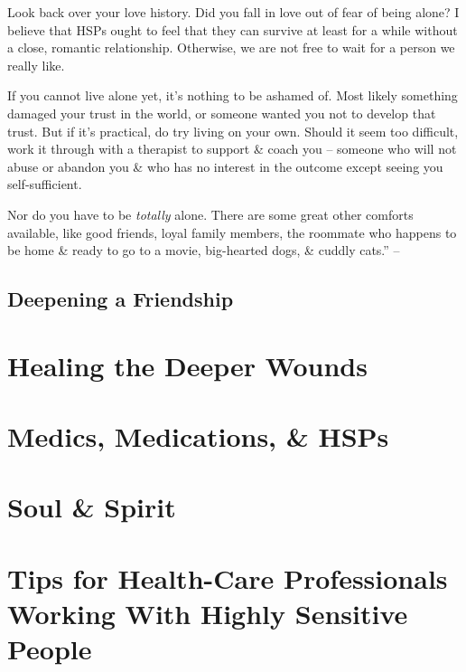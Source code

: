 \documentclass{article}
\numberwithin{equation}{section}
\begin{document}
Look back over your love history. Did you fall in love out of fear of being alone? I believe that HSPs ought to feel that they can survive at least for a while without a close, romantic relationship. Otherwise, we are not free to wait for a person we really like.

If you cannot live alone yet, it's nothing to be ashamed of. Most likely something damaged your trust in the world, or someone wanted you not to develop that trust. But if it's practical, do try living on your own. Should it seem too difficult, work it through with a therapist to support \& coach you -- someone who will not abuse or abandon you \& who has no interest in the outcome except seeing you self-sufficient.

Nor do you have to be \textit{totally} alone. There are some great other comforts available, like good friends, loyal family members, the roommate who happens to be home \& ready to go to a movie, big-hearted dogs, \& cuddly cats.'' -- \cite[pp. 178--179]{Aron2013}

\subsection{Deepening a Friendship}


\section{Healing the Deeper Wounds}


\section{Medics, Medications, \& HSPs}


\section{Soul \& Spirit}


\section{Tips for Health-Care Professionals Working With Highly Sensitive People}
\end{document}

